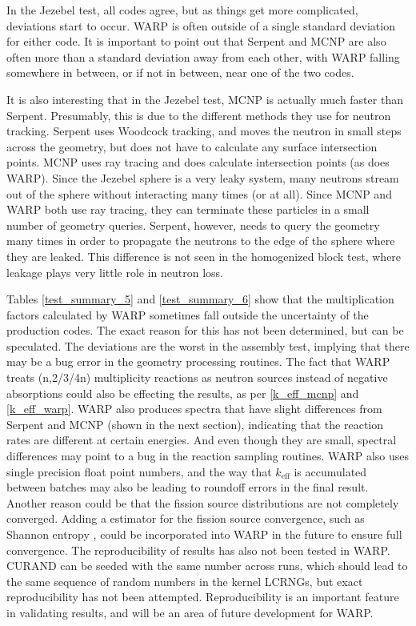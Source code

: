 In the Jezebel test, all codes agree, but as things get more complicated, deviations start to occur.  WARP is often outside of a single standard deviation for either code.  It is important to point out that Serpent and MCNP are also often more than a standard deviation away from each other, with WARP falling somewhere in between, or if not in between, near one of the two codes.

It is also interesting that in the Jezebel test, MCNP is actually much faster than Serpent.  Presumably, this is due to the different methods they use for neutron tracking.  Serpent uses Woodcock tracking, and moves the neutron in small steps across the geometry, but does not have to calculate any surface intersection points.  MCNP uses ray tracing and does calculate intersection points (as does WARP).  Since the Jezebel sphere is a very leaky system, many neutrons stream out of the sphere without interacting many times (or at all).  Since  MCNP and WARP both use ray tracing, they can terminate these particles in a small number of geometry queries.  Serpent, however, needs to query the geometry many times in order to propagate the neutrons to the edge of the sphere where they are leaked.  This difference is not seen in the homogenized block test, where leakage plays very little role in neutron loss.

Tables \ref{test_summary_5} and \ref{test_summary_6} show that the multiplication factors calculated by WARP sometimes fall outside the uncertainty of the production codes.  The exact reason for this has not been determined, but can be speculated.  The deviations are the worst in the assembly test, implying that there may be a bug error in the geometry processing routines.  The fact that WARP treats (n,2/3/4n) multiplicity reactions as neutron sources instead of negative absorptions could also be effecting the results, as per \eqref{k_eff_mcnp} and \eqref{k_eff_warp}.  WARP also produces spectra that have slight differences from Serpent and MCNP (shown in the next section), indicating that the reaction rates are different at certain energies.  And even though they are small, spectral differences may point to a bug in the reaction sampling routines.  WARP also uses single precision float point numbers, and the way that $k_\mathrm{eff}$ is accumulated between batches may also be leading to roundoff errors in the final result.  Another reason could be that the fission source distributions are not completely converged.  Adding a estimator for the fission source convergence, such as Shannon entropy \cite{mcnp}, could be incorporated into WARP in the future to ensure full convergence.  The reproducibility of results has also not been tested in WARP.  CURAND can be seeded with the same number across runs, which should lead to the same sequence of random numbers in the kernel LCRNGs, but exact reproducibility has not been attempted.  Reproducibility is an important feature in validating results, and will be an area of future development for WARP.

